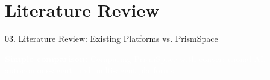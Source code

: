 \documentclass[aspectratio=169,10pt]{beamer}
\begin{document}
\section{Literature Review}

\begin{frame}[t]{03. Literature Review: Existing Platforms vs. PrismSpace}
\vspace{-0.44em}

\centering
\begin{tcolorbox}[
  enhanced, colback=lavenderDark!90, colframe=lavenderDark, arc=3pt,
  boxrule=0.5pt, width=0.98\linewidth, top=1.4pt, bottom=1.4pt, left=8pt, right=8pt,
  halign=center
]
  \textcolor{white}{\fontsize{6.6}{8.0}\selectfont\sffamily
  \textbf{Simple comparison:} Comparing PrismSpace with conversational AI, autonomous-agent, and multi-agent platforms.}
\end{tcolorbox}

\vspace{-0.46em}


\end{frame}
\end{document}
